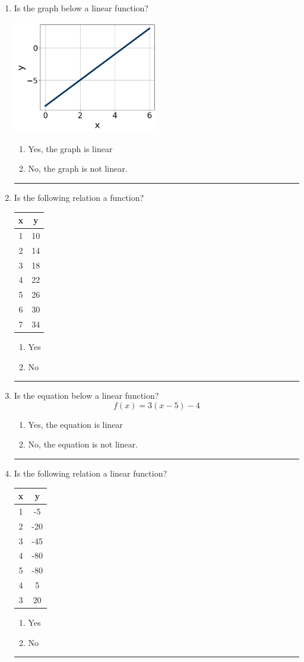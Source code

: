 \documentclass[14pt]{extbook}
\newcommand{\litem}[1]{\item#1\hspace*{-1cm}\rule{\textwidth}{0.4pt}}
\begin{document}
\begin{enumerate}
{\begin{enumerate}[label=\Alph*.]
\end{enumerate} }
\litem{
Is the graph below a linear function?
\begin{center}
    \includegraphics[width=0.5\textwidth]{../Figures/MA_8_F_1_2_graphO.png}
\end{center}
\begin{enumerate}[label=\Alph*.]
\item Yes, the graph is linear
\item No, the graph is not linear.

\end{enumerate} }
\litem{
Is the following relation a function?

\begin{tabular}{c|c}
x &y\tabularnewline \hline
1 &10\tabularnewline \hline
2 &14\tabularnewline \hline
3 &18\tabularnewline \hline
4 &22\tabularnewline \hline
5 &26\tabularnewline \hline
6 &30\tabularnewline \hline
7 &34\end{tabular}\begin{enumerate}[label=\Alph*.]
\item Yes
\item No

\end{enumerate} }
\litem{
Is the equation below a linear function?\[ f(x) = 3(x -5)-4 \]\begin{enumerate}[label=\Alph*.]
\item Yes, the equation is linear
\item No, the equation is not linear.

\end{enumerate} }
\litem{
Is the following relation a linear function?

\begin{tabular}{c|c}
x &y\tabularnewline \hline
1 &-5\tabularnewline \hline
2 &-20\tabularnewline \hline
3 &-45\tabularnewline \hline
4 &-80\tabularnewline \hline
5 &-80\tabularnewline \hline
4 &5\tabularnewline \hline
3 &20\end{tabular}\begin{enumerate}[label=\Alph*.]
\item Yes
\item No


\end{enumerate}}
\end{enumerate}
\end{document}
